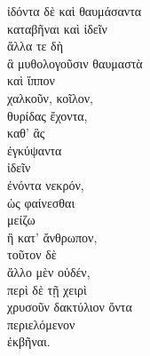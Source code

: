 {\large
\begin{greek}
\noindent ἰδόντα δὲ καὶ θαυμάσαντα\\
καταβῆναι καὶ ἰδεῖν\\
ἄλλα τε δὴ\\
\tabto{2em} ἃ μυθολογοῦσιν θαυμαστὰ\\
καὶ ἵππον\\
\tabto{2em} χαλκοῦν, κοῖλον,\\
\tabto{2em} θυρίδας ἔχοντα,\\
\tabto{4em} καθ' ἃς\\
\tabto{4em} ἐγκύψαντα\\
\tabto{4em} ἰδεῖν\\
\tabto{4em} ἐνόντα νεκρόν,\\
\tabto{6em} ὡς φαίνεσθαι\\
\tabto{6em} μείζω\\
\tabto{8em} ἢ κατ' ἄνθρωπον,\\
\tabto{4em} τοῦτον δὲ\\
\tabto{6em} ἄλλο μὲν οὐδέν,\\
\tabto{6em} περὶ δὲ τῇ χειρὶ\\
\tabto{6em} χρυσοῦν δακτύλιον ὄντα\\
\tabto{4em} περιελόμενον\\
\tabto{4em} ἐκβῆναι.\\

\end{greek}
}

